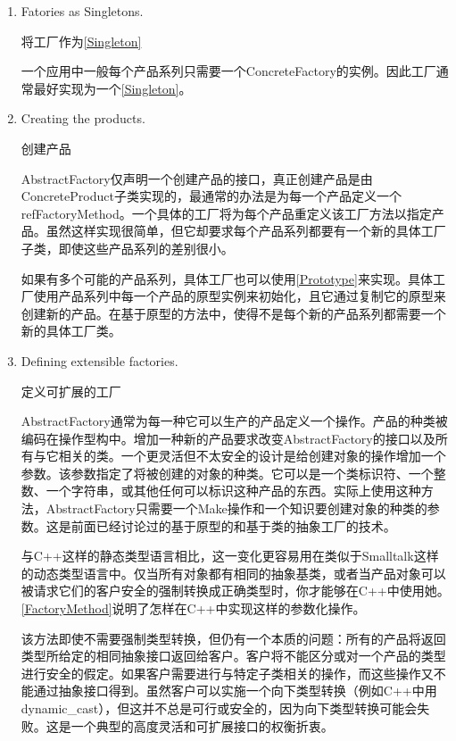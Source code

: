 \begin{enumerate}

\item Fatories as Singletons.

	  将工厂作为\ref{Singleton}

	  一个应用中一般每个产品系列只需要一个ConcreteFactory的实例。因此工厂通常最好实现为一个\ref{Singleton}。

\item Creating the products.

	  创建产品

	  AbstractFactory仅声明一个创建产品的接口，真正创建产品是由ConcreteProduct子类实现的，最通常的办法是为每一个产品定义一个ref{FactoryMethod}。一个具体的工厂将为每个产品重定义该工厂方法以指定产品。虽然这样实现很简单，但它却要求每个产品系列都要有一个新的具体工厂子类，即使这些产品系列的差别很小。

	  如果有多个可能的产品系列，具体工厂也可以使用\ref{Prototype}来实现。具体工厂使用产品系列中每一个产品的原型实例来初始化，且它通过复制它的原型来创建新的产品。在基于原型的方法中，使得不是每个新的产品系列都需要一个新的具体工厂类。

\item Defining extensible factories.

      定义可扩展的工厂

	  AbstractFactory通常为每一种它可以生产的产品定义一个操作。产品的种类被编码在操作型构中。增加一种新的产品要求改变AbstractFactory的接口以及所有与它相关的类。一个更灵活但不太安全的设计是给创建对象的操作增加一个参数。该参数指定了将被创建的对象的种类。它可以是一个类标识符、一个整数、一个字符串，或其他任何可以标识这种产品的东西。实际上使用这种方法，AbstractFactory只需要一个Make操作和一个知识要创建对象的种类的参数。这是前面已经讨论过的基于原型的和基于类的抽象工厂的技术。

	  与C++这样的静态类型语言相比，这一变化更容易用在类似于Smalltalk这样的动态类型语言中。仅当所有对象都有相同的抽象基类，或者当产品对象可以被请求它们的客户安全的强制转换成正确类型时，你才能够在C++中使用她。\ref{FactoryMethod}说明了怎样在C++中实现这样的参数化操作。

	  该方法即使不需要强制类型转换，但仍有一个本质的问题：所有的产品将返回类型所给定的相同抽象接口返回给客户。客户将不能区分或对一个产品的类型进行安全的假定。如果客户需要进行与特定子类相关的操作，而这些操作又不能通过抽象接口得到。虽然客户可以实施一个向下类型转换（例如C++中用dynamic_cast），但这并不总是可行或安全的，因为向下类型转换可能会失败。这是一个典型的高度灵活和可扩展接口的权衡折衷。

\end{enumerate}

